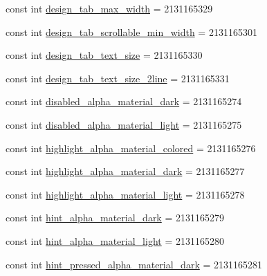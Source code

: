\begin{DoxyCompactItemize}
const int \mbox{\hyperlink{class_f_w_p_s___app_1_1_droid_1_1_resource_1_1_dimension_a14cf7ead0a5002183ea82e54d24b1ed7}{design\+\_\+tab\+\_\+max\+\_\+width}} = 2131165329
\item 
const int \mbox{\hyperlink{class_f_w_p_s___app_1_1_droid_1_1_resource_1_1_dimension_ae30ec291dec00a2bf0e6961111a35579}{design\+\_\+tab\+\_\+scrollable\+\_\+min\+\_\+width}} = 2131165301
\item 
const int \mbox{\hyperlink{class_f_w_p_s___app_1_1_droid_1_1_resource_1_1_dimension_a672f3fac06a382ec476fa9177b028e05}{design\+\_\+tab\+\_\+text\+\_\+size}} = 2131165330
\item 
const int \mbox{\hyperlink{class_f_w_p_s___app_1_1_droid_1_1_resource_1_1_dimension_ab794e2d808a13f78dc26351575031202}{design\+\_\+tab\+\_\+text\+\_\+size\+\_\+2line}} = 2131165331
\item 
const int \mbox{\hyperlink{class_f_w_p_s___app_1_1_droid_1_1_resource_1_1_dimension_ae8cf32247cee2e02f316410c9dcfb335}{disabled\+\_\+alpha\+\_\+material\+\_\+dark}} = 2131165274
\item 
const int \mbox{\hyperlink{class_f_w_p_s___app_1_1_droid_1_1_resource_1_1_dimension_aa0072a397d7b34bedbd76ea7d5a3a3c3}{disabled\+\_\+alpha\+\_\+material\+\_\+light}} = 2131165275
\item 
const int \mbox{\hyperlink{class_f_w_p_s___app_1_1_droid_1_1_resource_1_1_dimension_a7ccde29c2c050a06fb0924b981d8cb9e}{highlight\+\_\+alpha\+\_\+material\+\_\+colored}} = 2131165276
\item 
const int \mbox{\hyperlink{class_f_w_p_s___app_1_1_droid_1_1_resource_1_1_dimension_a6a0cfb29f0a8598006b49319e81bd60e}{highlight\+\_\+alpha\+\_\+material\+\_\+dark}} = 2131165277
\item 
const int \mbox{\hyperlink{class_f_w_p_s___app_1_1_droid_1_1_resource_1_1_dimension_a24c0f068cd033af289bf887f171f0b28}{highlight\+\_\+alpha\+\_\+material\+\_\+light}} = 2131165278
\item 
const int \mbox{\hyperlink{class_f_w_p_s___app_1_1_droid_1_1_resource_1_1_dimension_a57303b91a6592b92e411bdf2bad68d44}{hint\+\_\+alpha\+\_\+material\+\_\+dark}} = 2131165279
\item 
const int \mbox{\hyperlink{class_f_w_p_s___app_1_1_droid_1_1_resource_1_1_dimension_a97350bb713e186add18ee2af82a51c91}{hint\+\_\+alpha\+\_\+material\+\_\+light}} = 2131165280
\item 
const int \mbox{\hyperlink{class_f_w_p_s___app_1_1_droid_1_1_resource_1_1_dimension_a2e9602b3a4522ec60a60c16c5a6646f3}{hint\+\_\+pressed\+\_\+alpha\+\_\+material\+\_\+dark}} = 2131165281

\end{DoxyCompactItemize}
